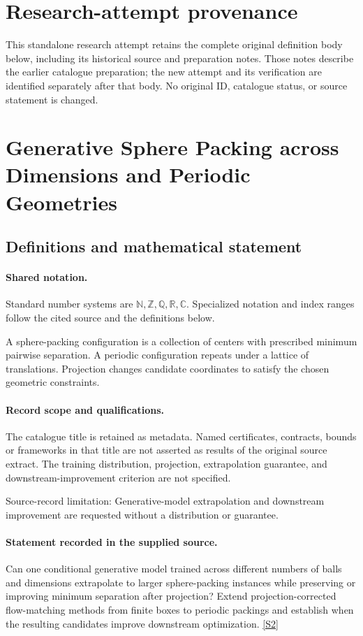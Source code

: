 \documentclass[11pt]{article}
\begin{document}
\section*{Research-attempt provenance}
This standalone research attempt retains the complete original definition body below,
including its historical source and preparation notes. Those notes describe the
earlier catalogue preparation; the new attempt and its verification are identified
separately after that body. No original ID, catalogue status, or source statement is changed.

\section{Generative Sphere Packing across Dimensions and Periodic Geometries}\label{statement}

\subsection{Definitions and mathematical statement}

\paragraph{Shared notation.}Standard number systems are $\mathbb N,\mathbb Z,\mathbb Q,\mathbb R,\mathbb C$. Specialized notation and index ranges follow the cited source and the definitions below.


A sphere-packing configuration is a collection of centers with prescribed minimum pairwise separation. A periodic configuration repeats under a lattice of translations. Projection changes candidate coordinates to satisfy the chosen geometric constraints.
\paragraph{Record scope and qualifications.}
The catalogue title is retained as metadata. Named certificates, contracts, bounds or frameworks in that title are not asserted as results of the original source extract.
The training distribution, projection, extrapolation guarantee, and downstream-improvement criterion are not specified.

Source-record limitation: Generative-model extrapolation and downstream improvement are requested without a distribution or guarantee.
\paragraph{Statement recorded in the supplied source.}
Can one conditional generative model trained across different numbers of balls and dimensions extrapolate to larger sphere-packing instances while preserving or improving minimum separation after projection? Extend projection-corrected flow-matching methods from finite boxes to periodic packings and establish when the resulting candidates improve downstream optimization. \href{https://doi.org/10.4171/owr/2025/43}{[S2]}
\end{document}
